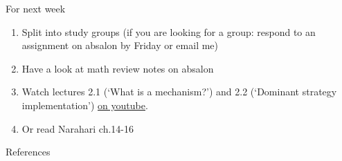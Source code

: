 \documentclass[english,10pt
,aspectratio=169
]{beamer}
\begin{document}
\begin{frame}{For next week}
	\begin{enumerate}
		\item Split into study groups (if you are looking for a group: respond to an assignment on absalon by Friday or email me)
		\item Have a look at math review notes on absalon
		\item Watch lectures 2.1 (`What is a mechanism?') and 2.2 (`Dominant strategy implementation') \href{https://www.youtube.com/playlist?list=PL4pUs4P_j1WasI0kO99OgNNd_hJwpct4D}{\uline{on youtube}}.
		\item Or read Narahari ch.14-16
	\end{enumerate}
\end{frame}


\appendix
\begin{frame}[allowframebreaks]{References}
	
	
\end{frame}
\end{document}
